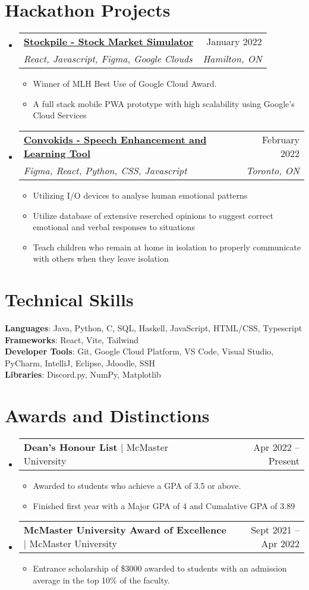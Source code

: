 \documentclass[letterpaper,11pt]{article}
\makeatletter
\newcommand{\resumeItem}[1]{
  \item\small{
    {#1 \vspace{-2pt}}
  }
}
\newcommand{\resumeSubheading}[4]{
  \vspace{-2pt}\item
    \begin{tabular*}{0.97\textwidth}[t]{l@{\extracolsep{\fill}}r}
      \textbf{#1} & #2 \\
      \textit{\small#3} & \textit{\small #4} \\
    \end{tabular*}\vspace{-7pt}
}
\newcommand{\resumeProjectHeading}[2]{
    \item
    \begin{tabular*}{0.97\textwidth}{l@{\extracolsep{\fill}}r}
      \small#1 & #2 \\
    \end{tabular*}\vspace{-7pt}
}
\newcommand{\resumeSubHeadingListStart}{\begin{itemize}[leftmargin=0.15in, label={}]}
\newcommand{\resumeSubHeadingListEnd}{\end{itemize}}
\newcommand{\resumeItemListStart}{\begin{itemize}}
\newcommand{\resumeItemListEnd}{\end{itemize}\vspace{-5pt}}
\makeatother
\begin{document}
\section{Hackathon Projects}
  \resumeSubHeadingListStart

    \resumeSubheading
      {\href{https://www.youtube.com/watch?v=_O0dha-w2K8}{Stockpile - Stock Market Simulator} \faExternalLink}{January 2022}
      {React, Javascript, Figma, Google Clouds}{Hamilton, ON}
      \resumeItemListStart
        \resumeItem{ Winner of MLH Best Use of Google Cloud Award.}
        \resumeItem{A full stack mobile PWA prototype with high scalability using Google’s Cloud Services}
      \resumeItemListEnd

    \resumeSubheading
      {\href{https://www.youtube.com/watch?v=7eW4TlOKxHo}{Convokids - Speech Enhancement and Learning Tool} \faExternalLink}{February 2022}
      {Figma, React, Python, CSS, Javascript}{Toronto, ON}
      \resumeItemListStart
        \resumeItem{Utilizing I/O devices to analyse human emotional patterns}
        \resumeItem{Utilize database of extensive reserched opinions to suggest correct emotional and verbal responses to situations}
        \resumeItem{Teach children who remain at home in isolation to properly communicate with others when they leave isolation}
      \resumeItemListEnd

  \resumeSubHeadingListEnd

\section{Technical Skills}
 \begin{itemize}[leftmargin=0.15in, label={}]
    \small{\item{
     \textbf{Languages}{: Java, Python, C, SQL, Haskell, JavaScript, HTML/CSS, Typescript} \\
     \textbf{Frameworks}{: React, Vite, Tailwind} \\
     \textbf{Developer Tools}{: Git, Google Cloud Platform, VS Code, Visual Studio, PyCharm, IntelliJ, Eclipse, Jdoodle, SSH} \\
     \textbf{Libraries}{: Discord.py, NumPy, Matplotlib}
    }}
 \end{itemize}

\section{Awards and Distinctions}
  \resumeSubHeadingListStart
    \resumeProjectHeading
        {{\textbf{Dean's Honour List}} $|$ McMaster University}{Apr 2022 -- Present}
        \resumeItemListStart
          \resumeItem{Awarded to students who achieve a GPA of 3.5 or above.}
          \resumeItem{Finished first year with a Major GPA of 4 and Cumalative GPA of 3.89}
        \resumeItemListEnd
    \resumeProjectHeading
    {{\textbf{McMaster University Award of Excellence}} $|$ McMaster University}{Sept 2021 -- Apr 2022}
    \resumeItemListStart
      \resumeItem{Entrance scholarship of \$3000 awarded to students with an admission average in the top 10\% of the faculty.}
    \resumeItemListEnd
  \resumeSubHeadingListEnd


\end{document}
